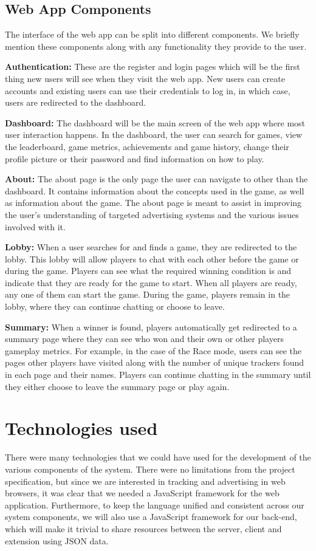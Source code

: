 \documentclass{l4proj}
\begin{document}
\subsection{Web App Components}
The interface of the web app can be split into different components. We briefly mention these components along with any functionality they provide to the user.

\textbf{Authentication:} These are the register and login pages which will be the first thing new users will see when they visit the web app. New users can create accounts and existing users can use their credentials to log in, in which case, users are redirected to the dashboard.

\textbf{Dashboard:} The dashboard will be the main screen of the web app where most user interaction happens. In the dashboard, the user can search for games, view the leaderboard, game metrics, achievements and game history, change their profile picture or their password and find information on how to play.

\textbf{About:} The about page is the only page the user can navigate to other than the dashboard. It contains information about the concepts used in the game, as well as information about the game. The about page is meant to assist in improving the user's understanding of targeted advertising systems and the various issues involved with it. 

\textbf{Lobby:} When a user searches for and finds a game, they are redirected to the lobby. This lobby will allow players to chat with each other before the game or during the game. Players can see what the required winning condition is and indicate that they are ready for the game to start. When all players are ready, any one of them can start the game. During the game, players remain in the lobby, where they can continue chatting or choose to leave.

\textbf{Summary:} When a winner is found, players automatically get redirected to a summary page where they can see who won and their own or other players gameplay metrics. For example, in the case of the Race mode, users can see the pages other players have visited along with the number of unique trackers found in each page and their names. Players can continue chatting in the summary until they either choose to leave the summary page or play again. 

\section{Technologies used}
There were many technologies that we could have used for the development of the various components of the system. There were no limitations from the project specification, but since we are interested in tracking and 
advertising in web browsers, it was clear that we needed a JavaScript framework for the web application. Furthermore, to keep the language unified and consistent across our system components, we will also use a JavaScript framework for our
back-end, which will make it trivial to share resources between the server, client and extension using JSON data. 
\end{document}

